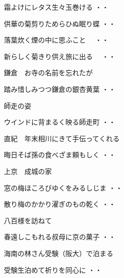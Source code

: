 \begin{shiika}霜よけにレタス生々玉巻ける
\hfill{・・}\end{shiika}
\begin{shiika}供華の菊剪りためらひぬ眠り蝶
\hfill{・・}\end{shiika}
\vspace{0.6cm}
\begin{shiika}落葉炊く煙の中に思ふこと　
\hfill{・・}\end{shiika}
\begin{shiika}新らしく菊きり供え旅に出る　
\hfill{・・}\end{shiika}
\vspace{0.6cm}
鎌倉　お寺の名前を忘れたが
\begin{shiika}踏み惜しみつつ鎌倉の銀杏黄葉
\hfill{・・}\end{shiika}
\vspace{0.6cm}
師走の姿
\begin{shiika}ウインドに背まるく映る師走町
\hfill{・・}\end{shiika}
\vspace{0.6cm}
直紀　年末相川にきて手伝ってくれる
\begin{shiika}晦日そば孫の食べざま頼もしく
\hfill{・・}\end{shiika}
\vspace{0.6cm}
上京　成城の家
\begin{shiika}窓の梅ほころびゆくをみるしじま
\hfill{・・}\end{shiika}
\begin{shiika}散り梅のかかり濯ぎのもの乾く
\hfill{・・}\end{shiika}
\vspace{0.6cm}
八百様を訪ねて
\begin{shiika}春遠しこもれる叔母に京の菓子
\hfill{・・}\end{shiika}
\vspace{0.6cm}
海南の林さん受験（阪大）で泊まる
\begin{shiika}受験生泊めて祈りを同心に
\hfill{・・}\end{shiika}
\vspace{0.6cm}
